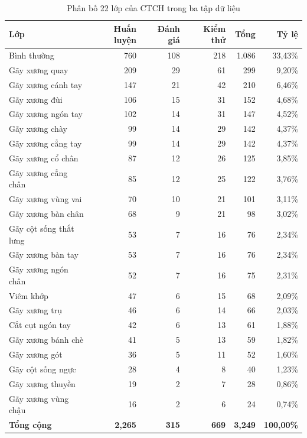 \begin{table}[htbp]
\centering
\small
\begin{tabular}{|l|r|r|r|r|r|}
\hline
\textbf{Lớp} & \textbf{Huấn luyện} & \textbf{Đánh giá} & \textbf{Kiểm thử} & \textbf{Tổng} & \textbf{Tỷ lệ} \\ \hline
Bình thường & 760 & 108 & 218 & 1.086 & 33,43\% \\ \hline
Gãy xương quay & 209 & 29 & 61 & 299 & 9,20\% \\ \hline
Gãy xương cánh tay & 147 & 21 & 42 & 210 & 6,46\% \\ \hline
Gãy xương đùi & 106 & 15 & 31 & 152 & 4,68\% \\ \hline
Gãy xương ngón tay & 102 & 14 & 31 & 147 & 4,52\% \\ \hline
Gãy xương chày & 99 & 14 & 29 & 142 & 4,37\% \\ \hline
Gãy xương cẳng tay & 99 & 14 & 29 & 142 & 4,37\% \\ \hline
Gãy xương cổ chân & 87 & 12 & 26 & 125 & 3,85\% \\ \hline
Gãy xương cẳng chân & 85 & 12 & 25 & 122 & 3,76\% \\ \hline
Gãy xương vùng vai & 70 & 10 & 21 & 101 & 3,11\% \\ \hline
Gãy xương bàn chân & 68 & 9 & 21 & 98 & 3,02\% \\ \hline
Gãy cột sống thắt lưng & 53 & 7 & 16 & 76 & 2,34\% \\ \hline
Gãy xương bàn tay & 53 & 7 & 16 & 76 & 2,34\% \\ \hline
Gãy xương ngón chân & 52 & 7 & 16 & 75 & 2,31\% \\ \hline
Viêm khớp & 47 & 6 & 15 & 68 & 2,09\% \\ \hline
Gãy xương trụ & 46 & 6 & 14 & 66 & 2,03\% \\ \hline
Cắt cụt ngón tay & 42 & 6 & 13 & 61 & 1,88\% \\ \hline
Gãy xương bánh chè & 41 & 5 & 13 & 59 & 1,82\% \\ \hline
Gãy xương gót & 36 & 5 & 11 & 52 & 1,60\% \\ \hline
Gãy cột sống ngực & 28 & 4 & 8 & 40 & 1,23\% \\ \hline
Gãy xương thuyền & 19 & 2 & 7 & 28 & 0,86\% \\ \hline
Gãy xương vùng chậu & 16 & 2 & 6 & 24 & 0,74\% \\ \hline
\textbf{Tổng cộng} & \textbf{2,265} & \textbf{315} & \textbf{669} & \textbf{3,249} & \textbf{100,00\%} \\ \hline
\end{tabular}
\caption{Phân bố 22 lớp của CTCH trong ba tập dữ liệu}
\label{tab:ctch_pathologies}
\end{table}

